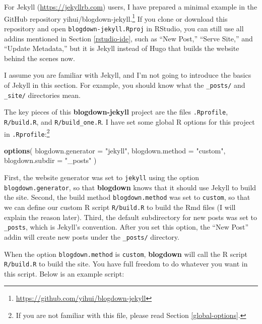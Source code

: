 \documentclass[12pt,]{krantz}
\makeatletter
\newenvironment{Shaded}{\begin{snugshade}}{\end{snugshade}}
\newcommand{\DataTypeTok}[1]{\textcolor[rgb]{0.13,0.29,0.53}{#1}}
\newcommand{\KeywordTok}[1]{\textcolor[rgb]{0.13,0.29,0.53}{\textbf{#1}}}
\newcommand{\NormalTok}[1]{#1}
\newcommand{\StringTok}[1]{\textcolor[rgb]{0.31,0.60,0.02}{#1}}
\renewcommand{\href}[2]{#2\footnote{\url{#1}}}
\newenvironment{kframe}{%
\medskip{}
\setlength{\fboxsep}{.8em}
 \def\at@end@of@kframe{}%
 \ifinner\ifhmode%
  \def\at@end@of@kframe{\end{minipage}}%
  \begin{minipage}{\columnwidth}%
 \fi\fi%
 \def\FrameCommand##1{\hskip\@totalleftmargin \hskip-\fboxsep
 \colorbox{shadecolor}{##1}\hskip-\fboxsep
     \hskip-\linewidth \hskip-\@totalleftmargin \hskip\columnwidth}%
 \MakeFramed {\advance\hsize-\width
   \@totalleftmargin\z@ \linewidth\hsize
   \@setminipage}}%
 {\par\unskip\endMakeFramed%
 \at@end@of@kframe}
\renewenvironment{Shaded}{\begin{kframe}}{\end{kframe}}
\theoremstyle{definition}
\theoremstyle{definition}
\theoremstyle{definition}
\theoremstyle{remark}
\makeatother
\begin{document}
For Jekyll (\url{https://jekyllrb.com}) users, I have
prepared a minimal example in the GitHub repository
\href{https://github.com/yihui/blogdown-jekyll}{yihui/blogdown-jekyll.}
If you clone or download this repository and open
\texttt{blogdown-jekyll.Rproj} in RStudio, you can still use all addins
mentioned in Section \ref{rstudio-ide}, such as ``New Post,'' ``Serve
Site,'' and ``Update Metadata,'' but it is Jekyll instead of Hugo that
builds the website behind the scenes now.

I assume you are familiar with Jekyll, and I'm not going to introduce
the basics of Jekyll in this section. For example, you should know what
the \texttt{\_posts/} and \texttt{\_site/} directories mean.

The key pieces of this \textbf{blogdown-jekyll} project are the files
\texttt{.Rprofile}, \texttt{R/build.R}, and \texttt{R/build\_one.R}. I
have set some global R options for this project in
\texttt{.Rprofile}:\footnote{If you are not familiar with this file,
  please read Section \ref{global-options}.}

\begin{Shaded}
\begin{Highlighting}[]
\KeywordTok{options}\NormalTok{(}
  \DataTypeTok{blogdown.generator =} \StringTok{"jekyll"}\NormalTok{,}
  \DataTypeTok{blogdown.method =} \StringTok{"custom"}\NormalTok{,}
  \DataTypeTok{blogdown.subdir =} \StringTok{"_posts"}
\NormalTok{)}
\end{Highlighting}
\end{Shaded}

First, the website generator was set to \texttt{jekyll} using the option
\texttt{blogdown.generator}, so that \textbf{blogdown} knows that it
should use Jekyll to build the site. Second, the build method
\texttt{blogdown.method} was set to \texttt{custom}, so that we can
define our custom R script \texttt{R/build.R} to build the Rmd files (I
will explain the reason later). Third, the default subdirectory for new
posts was set to \texttt{\_posts}, which is Jekyll's convention. After
you set this option, the ``New Post'' addin will create new posts under
the \texttt{\_posts/} directory.

When the option \texttt{blogdown.method} is \texttt{custom},
\textbf{blogdown} will call the R script \texttt{R/build.R} to build the
site. You have full freedom to do whatever you want in this script.
Below is an example script:
\end{document}
